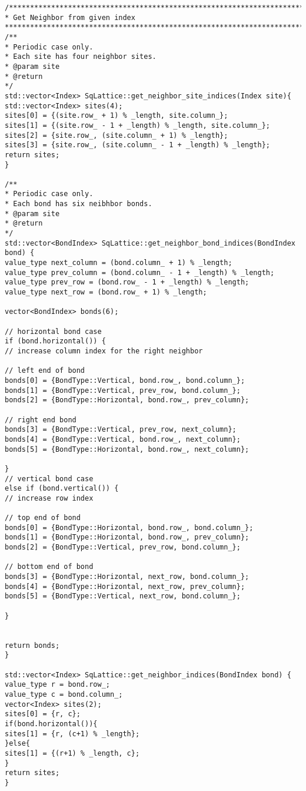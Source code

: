 \begin{lstlisting}[style=CStyle]
/******************************************************************************
* Get Neighbor from given index
******************************************************************************/
/**
* Periodic case only.
* Each site has four neighbor sites.
* @param site
* @return
*/
std::vector<Index> SqLattice::get_neighbor_site_indices(Index site){
std::vector<Index> sites(4);
sites[0] = {(site.row_ + 1) % _length, site.column_};
sites[1] = {(site.row_ - 1 + _length) % _length, site.column_};
sites[2] = {site.row_, (site.column_ + 1) % _length};
sites[3] = {site.row_, (site.column_ - 1 + _length) % _length};
return sites;
}

/**
* Periodic case only.
* Each bond has six neibhbor bonds.
* @param site
* @return
*/
std::vector<BondIndex> SqLattice::get_neighbor_bond_indices(BondIndex bond) {
value_type next_column = (bond.column_ + 1) % _length;
value_type prev_column = (bond.column_ - 1 + _length) % _length;
value_type prev_row = (bond.row_ - 1 + _length) % _length;
value_type next_row = (bond.row_ + 1) % _length;

vector<BondIndex> bonds(6);

// horizontal bond case
if (bond.horizontal()) {
// increase column index for the right neighbor

// left end of bond
bonds[0] = {BondType::Vertical, bond.row_, bond.column_};
bonds[1] = {BondType::Vertical, prev_row, bond.column_};
bonds[2] = {BondType::Horizontal, bond.row_, prev_column};

// right end bond
bonds[3] = {BondType::Vertical, prev_row, next_column};
bonds[4] = {BondType::Vertical, bond.row_, next_column};
bonds[5] = {BondType::Horizontal, bond.row_, next_column};

}
// vertical bond case
else if (bond.vertical()) {
// increase row index

// top end of bond
bonds[0] = {BondType::Horizontal, bond.row_, bond.column_};
bonds[1] = {BondType::Horizontal, bond.row_, prev_column};
bonds[2] = {BondType::Vertical, prev_row, bond.column_};

// bottom end of bond
bonds[3] = {BondType::Horizontal, next_row, bond.column_};
bonds[4] = {BondType::Horizontal, next_row, prev_column};
bonds[5] = {BondType::Vertical, next_row, bond.column_};

}


return bonds;
}

std::vector<Index> SqLattice::get_neighbor_indices(BondIndex bond) {
value_type r = bond.row_;
value_type c = bond.column_;
vector<Index> sites(2);
sites[0] = {r, c};
if(bond.horizontal()){
sites[1] = {r, (c+1) % _length};
}else{
sites[1] = {(r+1) % _length, c};
}
return sites;
}


\end{lstlisting}
